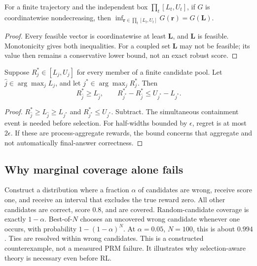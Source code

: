 \begin{proposition}
For a finite trajectory and the independent box $\prod_t[L_t,U_t]$, if $G$ is
coordinatewise nondecreasing, then
$\inf_{\bm r\in\prod_t[L_t,U_t]}G(\bm r)=G(\bm L)$.
\end{proposition}
\begin{proof}
Every feasible vector is coordinatewise at least $\bm L$, and $\bm L$ is
feasible. Monotonicity gives both inequalities. For a coupled set $\bm L$ may
not be feasible; its value then remains a conservative lower bound, not an
exact robust score.
\end{proof}

\begin{proposition}
Suppose $R_j^*\in[L_j,U_j]$ for every member of a finite candidate pool.
Let $\hat j\in\arg\max_jL_j$, and let $j^*\in\arg\max_jR_j^*$. Then
\[
 R_{\hat j}^*\ge L_{\hat j},\qquad
 R_{j^*}^*-R_{\hat j}^*\le U_{j^*}-L_{j^*}.
\]
\end{proposition}
\begin{proof}
$R_{\hat j}^*\ge L_{\hat j}\ge L_{j^*}$ and
$R_{j^*}^*\le U_{j^*}$. Subtract. The simultaneous containment event is needed
before selection. For half-widths bounded by $\epsilon$, regret is at most
$2\epsilon$. If these are process-aggregate rewards, the bound concerns that
aggregate and not automatically final-answer correctness.
\end{proof}

\subsection{Why marginal coverage alone fails}
Construct a distribution where a fraction $\alpha$ of candidates are wrong,
receive score one, and receive an interval that excludes the true reward zero.
All other candidates are correct, score $0.8$, and are covered. Random-candidate
coverage is exactly $1-\alpha$. Best-of-$N$ chooses an uncovered wrong candidate
whenever one occurs, with probability $1-(1-\alpha)^N$. At $\alpha=0.05$,
$N=100$, this is about $0.994$. Ties are resolved within wrong candidates.
This is a constructed counterexample, not a measured PRM failure. It illustrates
why selection-aware theory is necessary even before RL.

